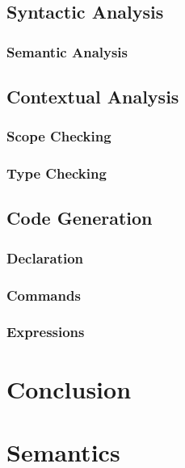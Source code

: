 \section{Syntactic Analysis}
\subsection{Semantic Analysis}
\section{Contextual Analysis}
\subsection{Scope Checking}
\subsection{Type Checking}
\section{Code Generation}
\subsection{Declaration}
\subsection{Commands}
\subsection{Expressions}

\renewcommand{\ind}[1]{}
\chapter{Conclusion}



\begingroup
	\raggedright
	{}	%
\endgroup


\newpage
\listoffixmes	%

\clearforchapter
\appendix	%


\renewcommand{\ind}[1]{}
\chapter{Semantics}
\ind{TransitionRules}
